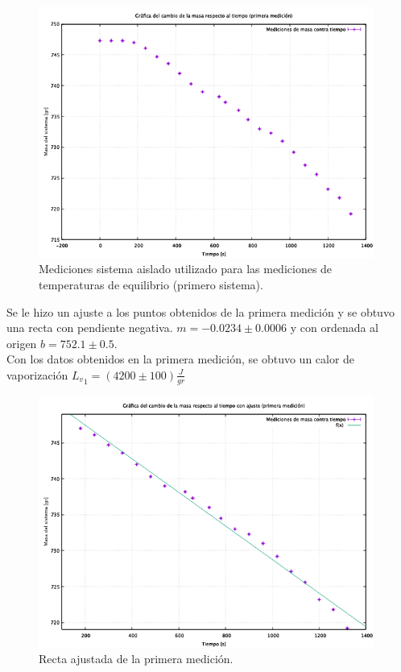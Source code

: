 \documentclass[a4paper]{article}
\begin{document}
\begin{figure}[H]
    \centering
    \includegraphics[width=11cm]{primeramed.png}
    \caption{Mediciones sistema aislado utilizado para las mediciones de temperaturas de equilibrio (primero sistema).}
\end{figure}
Se le hizo un ajuste a los puntos obtenidos de la primera medición y se obtuvo una recta con pendiente negativa. $m=-0.0234\pm0.0006$ y con ordenada al origen $b=752.1\pm0.5$.\\
Con los datos obtenidos en la primera medición, se obtuvo un calor de vaporización ${{L}_v}_1=(4200\pm100)\frac{J}{gr}$
\begin{figure}[H]
    \centering
    \includegraphics[width=11cm]{primeraajuste.png}
    \caption{Recta ajustada de la primera medición.}
\end{figure}
\end{document}

